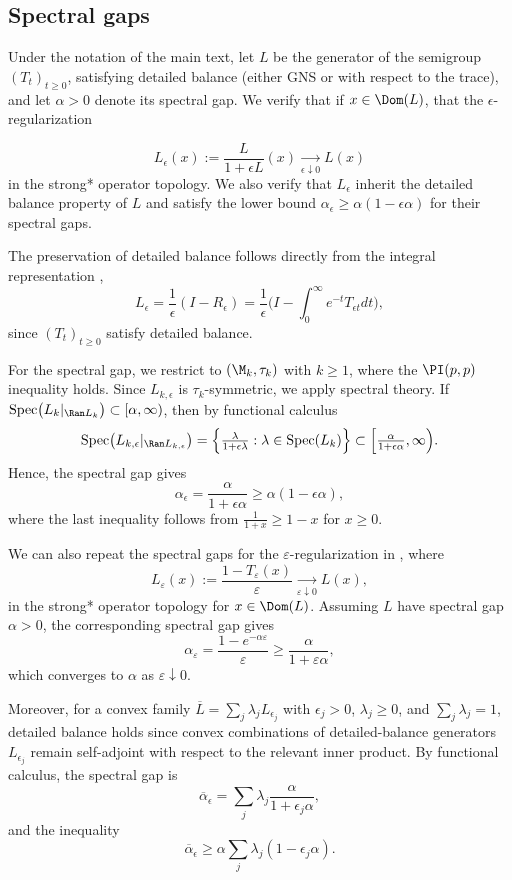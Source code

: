 \documentclass[sn-mathphys-num]{sn-jnl}
\begin{document}
\subsection{Spectral gaps}
Under the notation of the main text, let $L$ be the generator of the
semigroup $(T_t)_{t\ge0}$, satisfying detailed balance (either
GNS or with respect to the trace), and let
$\alpha>0$ denote its spectral gap. We verify that if $x\in \Dom(L)$, that the $\epsilon$-regularization

$$\displaystyle L_\epsilon(x) := \frac{L}{1+\epsilon L}(x)\xrightarrow[{\epsilon\downarrow0}]{} L(x)$$
in the strong* operator topology.
We also verify that $L_\epsilon$
inherit the detailed balance property of $L$ and satisfy the lower bound
$\alpha_\epsilon \ge \alpha(1-\epsilon\alpha)$ for their spectral gaps.


The preservation of detailed balance follows directly from the integral
representation \cite[Prop.~2.5]{cipriani_derivations_2003},
\[
L_\epsilon
= \frac{1}{\epsilon}(I-R_\epsilon)
= \frac{1}{\epsilon}\bigl(I-\int_0^\infty e^{-t}T_{\epsilon t}dt\bigr),
\]
since $(T_t)_{t\ge0}$ satisfy detailed balance.

For the spectral gap, we restrict to $(\M_k,\tau_k)$ with $k\ge1$, where the
$\PI(p,p)$ inequality holds. Since $L_{k,\epsilon}$ is
$\tau_k$-symmetric, we apply spectral theory. If $\text{Spec}\bigl(L_k|_{\Ran L_k}\bigr)\subset[\alpha,\infty)$,
then by functional calculus
\[
\text{Spec}\bigl(L_{k,\epsilon}|_{\Ran L_{k,\epsilon}}\bigr)
= \Bigl\{ \tfrac{\lambda}{1+\epsilon\lambda} : \lambda\in\text{Spec}(L_k) \Bigr\}
\subset \Bigl[\tfrac{\alpha}{1+\epsilon\alpha},\infty\Bigr).
\]
Hence, the spectral gap gives
\[
\alpha_\epsilon = \frac{\alpha}{1+\epsilon\alpha} \ge \alpha(1-\epsilon\alpha),
\]
where the last inequality follows from $\tfrac{1}{1+x}\ge 1-x$ for $x\ge0$.

\begin{remark}\label{rmk:t-reg-sg}
    We can also repeat the spectral gaps for the $\varepsilon$-regularization in \cite{JungeRicardShlyakhtenko2025}, where
    \[
    L_\varepsilon(x):=\frac{1-T_\varepsilon(x)}{\varepsilon}\xrightarrow[{\varepsilon\downarrow0}]{} L(x),
    \]
in the strong* operator topology for $x\in \Dom(L)$. Assuming $L$ have spectral gap $\alpha>0$, the corresponding spectral gap gives
\[
\alpha_\varepsilon=\frac{1-e^{-\alpha \varepsilon}}{\varepsilon}\ge \frac{\alpha}{1+\varepsilon\alpha},
\]
which converges to $\alpha$ as $\varepsilon\downarrow 0$.
\end{remark}
Moreover, for a convex family $\overline L=\sum_j \lambda_j L_{\epsilon_j}$ with
$\epsilon_j>0$, $\lambda_j\ge0$, and $\sum_j\lambda_j=1$, detailed balance holds
since convex combinations of detailed-balance generators $L_{\epsilon_j}$ remain self-adjoint with respect to the relevant inner product.
By functional calculus, the spectral gap is
\[
\overline\alpha_\epsilon = \sum_j \lambda_j \frac{\alpha}{1+\epsilon_j\alpha},
\]
and the inequality
\[
\overline\alpha_\epsilon \ge \alpha \sum_j \lambda_j (1-\epsilon_j\alpha).
\]
\end{document}
